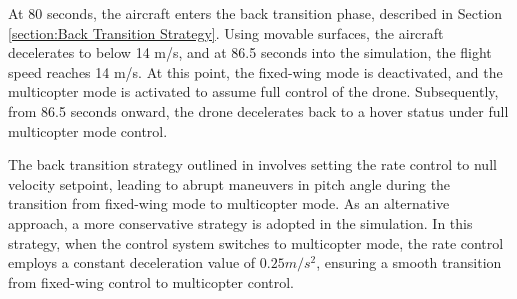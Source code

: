 At 80 seconds, the aircraft enters the back transition phase, described in Section \ref{section:Back Transition Strategy}. Using movable surfaces, the aircraft decelerates to below 14 m/s, and at 86.5 seconds into the simulation, the flight speed reaches 14 m/s. At this point, the fixed-wing mode is deactivated, and the multicopter mode is activated to assume full control of the drone. Subsequently, from 86.5 seconds onward, the drone decelerates back to a hover status under full multicopter mode control. 

The back transition strategy outlined in \cite{battaini2022} involves setting the rate control to null velocity setpoint, leading to abrupt maneuvers in pitch angle during the transition from fixed-wing mode to multicopter mode. As an alternative approach, a more conservative strategy is adopted in the simulation. In this strategy, when the control system switches to multicopter mode, the rate control employs a constant deceleration value of $0.25 
 m/s^2$, ensuring a smooth transition from fixed-wing control to multicopter control.

